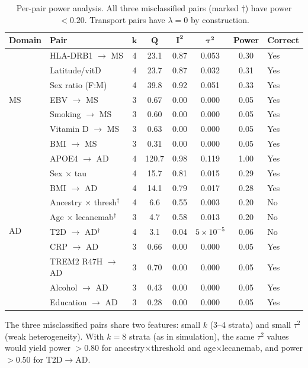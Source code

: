 \documentclass{article}
\begin{document}
\begin{table}[h]
\centering
\caption{Per-pair power analysis. All three misclassified pairs (marked $\dagger$) have power $< 0.20$. Transport pairs have $\lambda = 0$ by construction.}
\label{tab:power-full}
\small
\begin{tabular}{@{}llcccccl@{}}
\toprule
\textbf{Domain} & \textbf{Pair} & $\boldsymbol{k}$ & $\boldsymbol{Q}$ & $\boldsymbol{I^2}$ & $\boldsymbol{\tau^2}$ & \textbf{Power} & \textbf{Correct} \\
\midrule
\multirow{7}{*}{MS}
& HLA-DRB1 $\to$ MS & 4 & 23.1 & 0.87 & 0.053 & 0.30 & Yes \\
& Latitude/vitD & 4 & 23.7 & 0.87 & 0.032 & 0.31 & Yes \\
& Sex ratio (F:M) & 4 & 39.8 & 0.92 & 0.051 & 0.33 & Yes \\
& EBV $\to$ MS & 3 & 0.67 & 0.00 & 0.000 & 0.05 & Yes \\
& Smoking $\to$ MS & 3 & 0.60 & 0.00 & 0.000 & 0.05 & Yes \\
& Vitamin D $\to$ MS & 3 & 0.63 & 0.00 & 0.000 & 0.05 & Yes \\
& BMI $\to$ MS & 3 & 0.31 & 0.00 & 0.000 & 0.05 & Yes \\
\midrule
\multirow{10}{*}{AD}
& APOE4 $\to$ AD & 4 & 120.7 & 0.98 & 0.119 & 1.00 & Yes \\
& Sex $\times$ tau & 4 & 15.7 & 0.81 & 0.015 & 0.29 & Yes \\
& BMI $\to$ AD & 4 & 14.1 & 0.79 & 0.017 & 0.28 & Yes \\
& Ancestry $\times$ thresh$^\dagger$ & 4 & 6.6 & 0.55 & 0.003 & 0.20 & No \\
& Age $\times$ lecanemab$^\dagger$ & 3 & 4.7 & 0.58 & 0.013 & 0.20 & No \\
& T2D $\to$ AD$^\dagger$ & 4 & 3.1 & 0.04 & $5 \times 10^{-5}$ & 0.06 & No \\
& CRP $\to$ AD & 3 & 0.66 & 0.00 & 0.000 & 0.05 & Yes \\
& TREM2 R47H $\to$ AD & 3 & 0.70 & 0.00 & 0.000 & 0.05 & Yes \\
& Alcohol $\to$ AD & 3 & 0.43 & 0.00 & 0.000 & 0.05 & Yes \\
& Education $\to$ AD & 3 & 0.28 & 0.00 & 0.000 & 0.05 & Yes \\
\bottomrule
\end{tabular}
\end{table}

The three misclassified pairs share two features: small $k$ (3--4 strata) and small $\tau^2$ (weak heterogeneity). With $k = 8$ strata (as in simulation), the same $\tau^2$ values would yield power $> 0.80$ for ancestry$\times$threshold and age$\times$lecanemab, and power $> 0.50$ for T2D$\to$AD.
\end{document}
